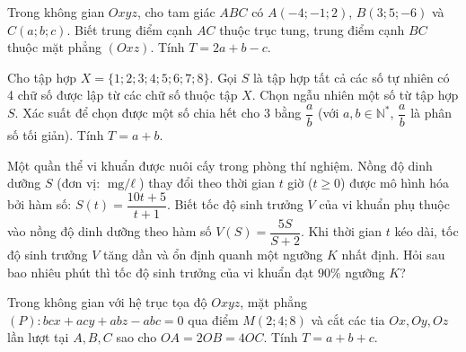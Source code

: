 \documentclass[12pt,a4paper]{article}
\begin{document}
\begin{ex}
	Trong không gian $Oxyz$, cho tam giác $ABC$ có $A(-4; -1; 2)$, $B(3; 5; -6)$ và $C(a; b; c)$. Biết trung điểm cạnh $AC$ thuộc trục tung, trung điểm cạnh $BC$ thuộc mặt phẳng $(Oxz)$. Tính $T = 2a + b - c$.
	\par{}
	\loigiai{}
\end{ex}

\begin{ex}
	Cho tập hợp $X = \{1; 2; 3; 4; 5; 6; 7; 8\}$. Gọi $S$ là tập hợp tất cả các số tự nhiên có 4 chữ số được lập từ các chữ số thuộc tập $X$. Chọn ngẫu nhiên một số từ tập hợp $S$. Xác suất để chọn được một số chia hết cho 3 bằng $\dfrac{a}{b}$ (với $a, b \in \mathbb{N}^*$, $\dfrac{a}{b}$ là phân số tối giản). Tính $T = a + b$.
	\par{}
	\loigiai{}
\end{ex}

\begin{ex}
	Một quần thể vi khuẩn được nuôi cấy trong phòng thí nghiệm. Nồng độ dinh dưỡng $S$ (đơn vị: $\text{mg/}\ell$) thay đổi theo thời gian $t$ giờ ($t \geqslant 0$) được mô hình hóa bởi hàm số: $S(t) = \dfrac{10t + 5}{t + 1}$. Biết tốc độ sinh trưởng $V$ của vi khuẩn phụ thuộc vào nồng độ dinh dưỡng theo hàm số $V(S) = \dfrac{5S}{S + 2}$. Khi thời gian $t$ kéo dài, tốc độ sinh trưởng $V$ tăng dần và ổn định quanh một ngưỡng $K$ nhất định. Hỏi sau bao nhiêu phút thì tốc độ sinh trưởng của vi khuẩn đạt $90\%$ ngưỡng $K$?
	\par{}
	\loigiai{}
\end{ex}

\begin{ex}
	Trong không gian với hệ trục tọa độ $Oxyz$, mặt phẳng $(P)\colon bcx + acy + abz - abc = 0$ qua điểm $M(2; 4; 8)$ và cắt các tia $Ox, Oy, Oz$ lần lượt tại $A, B, C$ sao cho $OA = 2OB = 4OC$. Tính $T = a + b + c$.
	\par{}
	\loigiai{}
\end{ex}
\end{document}
